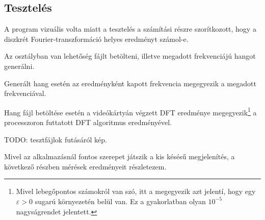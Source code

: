 
\subsection{Tesztel\'es}
A program vizu\'alis volta miatt a tesztel\'es a sz\'am\'it\'asi r\'eszre szor\'itkozott, hogy a diszkr\'et Fourier-transzform\'aci\'o helyes eredm\'enyt sz\'amol-e.

Az  oszt\'alyban van lehet\H os\'eg  f\'ajlt bet\"olteni, illetve megadott frekvenci\'aj\'u hangot gener\'alni.

Gener\'alt hang eset\'en az eredm\'enyk\'ent kapott frekvencia megegyezik a megadott frekvenci\'aval.

Hang f\'ajl bet\"olt\'ese eset\'en a vide\'ok\'arty\'an v\'egzett DFT eredm\'enye megegyezik\footnote{Mivel lebeg\H opontos sz\'amokr\'ol van sz\'o, itt a megegyezik azt jelent\'i, hogy egy $\varepsilon>0$ sugar\'u k\"ornyezet\'en bel\"ul van. Ez a gyakorlatban olyan $10^{-5}$ nagys\'agrendet jelentett.} a processzoron futtatott DFT algoritmus eredm\'eny\'evel.

TODO: tesztf\'ajlok fut\'as\'ar\'ol k\'ep.

Mivel az alkalmaz\'asn\'al fontos szerepet j\'atszik a kis k\'es\'es\H u megjelen\'it\'es, a k\"ovetkez\H o r\'eszben m\'er\'esek eredm\'enyeit r\'eszletezem.